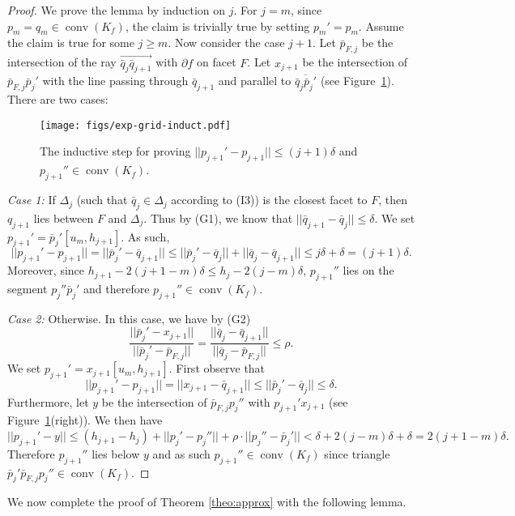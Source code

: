 \documentclass[11pt]{myclass}
\newcommand{\conv}[1]{\mathop{\mathrm{conv}}(#1)}
\newcommand{\fp}{\bar{p}}
\newcommand{\fq}{\bar{q}}
\newcommand{\point}[3]{{#1}[#3,#2]}
\begin{document}
\begin{proof}
We prove the lemma by induction on $j$. For $j=m$,  since $p_m=q_m \in \conv{K_f}$, the claim is trivially true by setting $p_m'=p_m$.  Assume the claim is true for some $j\geq m$.  Now consider the case $j+1$.  Let $\fp_{F,j}$ be the intersection of the ray $\overrightarrow{\fq_j\fq_{j+1}}$ with $\partial f$ on facet $F$. 
Let $x_{j+1}$ be the intersection of $\fp_{F,j} \fp_j'$ with the line passing through $\fq_{j+1}$ and parallel to $\overline{\fq_j \fp_j'}$ (see Figure~\ref{fig:induction}). There are two cases:
 
 \begin{figure}[htb!]
\begin{center}
\texttt{[image: figs/exp-grid-induct.pdf]}
\end{center}
\caption{The inductive step for proving $||p_{j+1}' - p_{j+1}|| \leq (j+1) \delta$ and $p_{j+1}'' \in \conv{K_f}$.}
\label{fig:induction}
\end{figure}
 
 \smallskip 
 {\em Case 1:} If $\Delta_j$  (such that $\fq_j \in \Delta_j$ according to (I3)) is the closest facet to $F$, then $q_{j+1}$ lies between $F$ and $\Delta_j$.  Thus by (G1), we know that  $||\fq_{j+1} - \fq_j || \leq \delta$. We set $p_{j+1}' = \point{\fp_j'}{h_{j+1}}{u_m}$. As such, 
$$
|| p_{j+1}' - p_{j+1} || = ||\fp_j' -  \fq_{j+1}|| \leq || \fp_j' - \fq_j|| + ||\fq_j - \fq_{j+1}|| \leq j\delta + \delta= (j+1)\delta.
$$
Moreover, since $h_{j+1} -  2(j+1-m)\delta \leq h_j- 2(j-m)\delta$, $p_{j+1}''$ lies on the segment $p_j'' \fp_j'$ and therefore $p_{j+1}''\in\conv{K_f}$.

 \smallskip  
 {\em Case 2:} Otherwise. In this case, we have by (G2)
$$
\frac{||\fp_j' - x_{j+1}||}{||\fp_j' - \fp_{F,j}||} = \frac{|| \fq_j - \fq_{j+1}||}{|| \fq_j - \fp_{F,j}||} \leq  \rho.
$$ 
We set $p_{j+1}' = \point{x_{j+1}}{h_{j+1}}{u_m}$. First observe that
$$
|| p_{j+1}' - p_{j+1} || = || x_{j+1} -  \fq_{j+1} || \leq ||\fp_j' - \fq_j|| \leq \delta. 
$$
Furthermore, let $y$ be the intersection of $\fp_{F,j} p_j''$ with $p_{j+1}'x_{j+1}$ (see Figure~\ref{fig:induction}(right)). We then have
$$
|| p_{j+1}' - y || \leq  (h_{j+1}-h_j) + ||p_j' - p_j''||  + \rho \cdot ||p_j'' - \fp_j'|| < \delta + 2(j-m)\delta +\delta = 2(j+1-m)\delta.
$$
  Therefore $p_{j+1}''$ lies below $y$ and as such $p_{j+1}'' \in \conv{K_f}$ since triangle $\fp_j' \fp_{F,j} p_j'' \in \conv{K_f}$.  
\end{proof}

We now complete the proof of Theorem \ref{theo:approx} with the following lemma.
\end{document}
